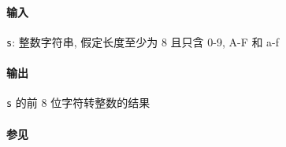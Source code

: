 \paragraph{输入}

\verb|s|: 整数字符串, 假定长度至少为 8 且只含 0-9, A-F 和 a-f

\paragraph{输出}

\verb|s| 的前 8 位字符转整数的结果

\paragraph{参见}

